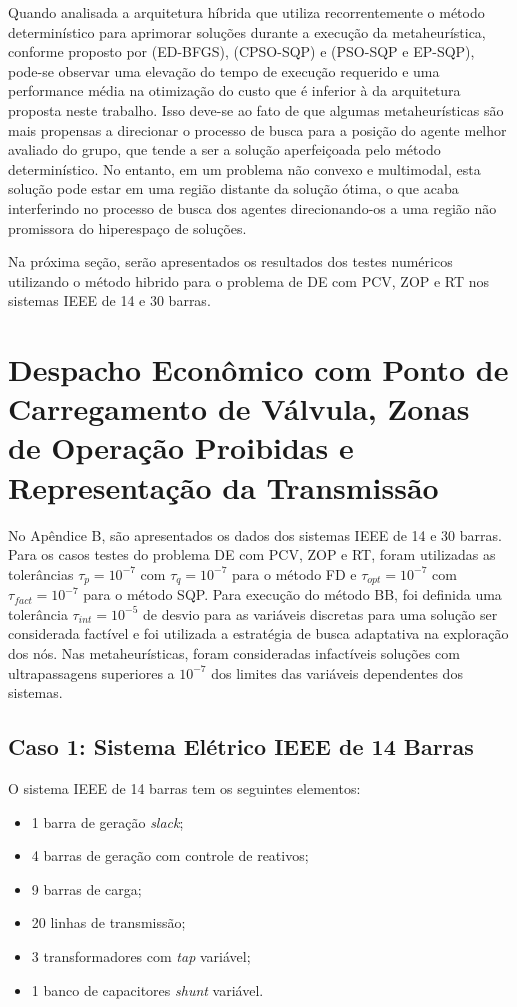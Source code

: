 \documentclass[
	12pt,				%
	openany,			%
	twoside,			%
	a4paper,			%
	chapter=TITLE,		%
	section=Title,		%
	subsection=Title,	%
	subsubsection=Title,%
	english,			%
	french,				%
	spanish,			%
	brazil			%
	]{abntex2}
\begin{document}
\begin{ERRATA}
Quando analisada a arquitetura híbrida que utiliza recorrentemente o método determinístico para aprimorar soluções durante a execução da metaheurística, conforme proposto por  (ED-BFGS),  (CPSO-SQP) e  (PSO-SQP e EP-SQP), pode-se observar uma elevação do tempo de execução requerido e uma performance média na otimização do custo que é inferior à da arquitetura proposta neste trabalho. Isso deve-se ao fato de que algumas metaheurísticas são mais propensas a direcionar o processo de busca para a posição do agente melhor avaliado do grupo, que tende a ser a solução aperfeiçoada pelo método determinístico. No entanto, em um problema não convexo e multimodal, esta solução pode estar em uma região distante da solução ótima, o que acaba interferindo no processo de busca dos agentes direcionando-os a uma região não promissora do hiperespaço de soluções.

Na próxima seção, serão apresentados os resultados dos testes numéricos utilizando o método hibrido para o problema de DE com PCV, ZOP e RT nos sistemas IEEE de 14 e 30 barras.


\section{Despacho Econômico com Ponto de Carregamento de Válvula, Zonas de Operação Proibidas e Representação da Transmissão}

No Apêndice B, são apresentados os dados dos sistemas IEEE de 14 e 30 barras. Para os casos testes do problema DE com PCV, ZOP e RT, foram utilizadas as tolerâncias $\tau_p = 10^{-7}$ com $\tau_q = 10^{-7}$ para o método FD e $\tau_{opt} = 10^{-7}$ com $\tau_{fact} = 10^{-7}$ para o método SQP. Para execução do método BB, foi definida uma tolerância $\tau_{int} = 10^{-5}$ de desvio para as variáveis discretas para uma solução ser considerada factível e foi utilizada a estratégia de busca adaptativa na exploração dos nós. Nas metaheurísticas, foram consideradas infactíveis soluções com ultrapassagens superiores a $10^{-7}$ dos limites das variáveis dependentes dos sistemas.

\subsection{Caso 1: Sistema Elétrico IEEE de 14 Barras}

O sistema IEEE de 14 barras tem os seguintes elementos:

\begin{itemize}
    \item 1 barra de geração \emph{slack};
    \item 4 barras de geração com controle de reativos;
    \item 9 barras de carga;
    \item 20 linhas de transmissão;
    \item 3 transformadores com \emph{tap} variável;
    \item 1 banco de capacitores \emph{shunt} variável.
\end{itemize}


\end{ERRATA}
\end{document}
